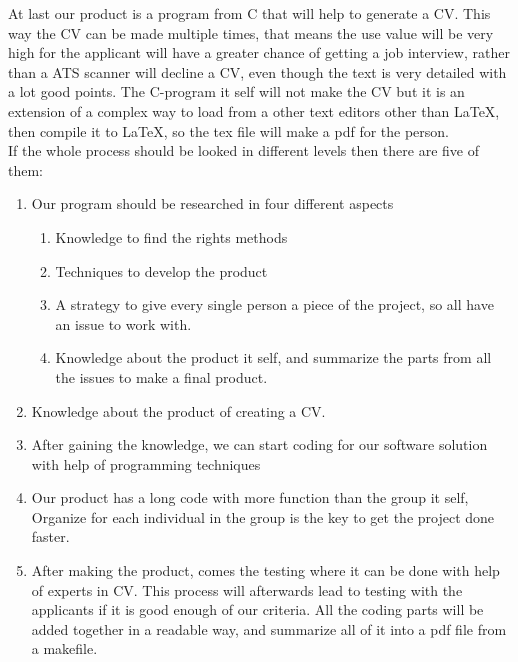 At last our product is a program from C that will help to generate a CV. This way the CV can be made multiple times,
that means the use value will be very high for the applicant will have a greater chance of getting a job interview,
rather than a ATS scanner will decline a CV, even though the text is very detailed with a lot good points.
The C-program it self will not make the CV but it is an extension of a complex way to load from a other text editors
other than LaTeX, then compile it to LaTeX, so the tex file will make a pdf for the person.\\

If the whole process should be looked in different levels then there are five of them:

\begin{enumerate}
  \item Our program should be researched in four different aspects 
  \begin{enumerate}
    \item Knowledge to find the rights methods 
    \item Techniques to develop the product
    \item A strategy to give every single person a piece of the project, so all have an issue to work with.
    \item Knowledge about the product it self, and summarize the parts from all the issues to make a final product.
  \end{enumerate}
  \item Knowledge about the product of creating a CV.
  \item After gaining the knowledge,
        we can start coding for our software solution with help of programming techniques
  \item Our product has a long code with more function than the group it self, 
        Organize for each individual in the group is the key to get the project done faster.
  \item After making the product, comes the testing where it can be done with help of experts in CV.
        This process will afterwards lead to testing with the applicants if it is good enough of our criteria.
        All the coding parts will be added together in a readable way, and summarize all of it into a pdf file from a makefile.
\end{enumerate}